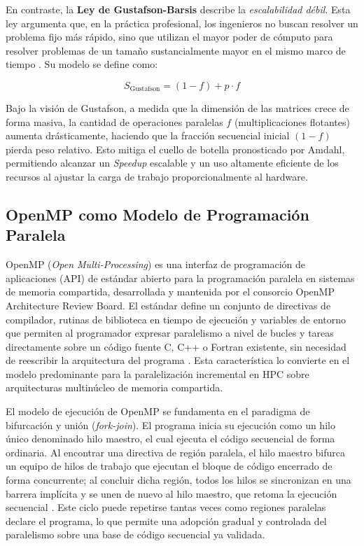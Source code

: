 En contraste, la \textbf{Ley de Gustafson-Barsis} describe la \textit{escalabilidad débil}. Esta ley argumenta que, en la práctica profesional, los ingenieros no buscan resolver un problema fijo más rápido, sino que utilizan el mayor poder de cómputo para resolver problemas de un tamaño sustancialmente mayor en el mismo marco de tiempo \parencite{Gustafson1988Reevaluating}. Su modelo se define como:

\begin{equation}
    S_{\text{Gustafson}} = (1 - f) + p \cdot f
\end{equation}

Bajo la visión de Gustafson, a medida que la dimensión de las matrices crece de forma masiva, la cantidad de operaciones paralelas \(f\) (multiplicaciones flotantes) aumenta drásticamente, haciendo que la fracción secuencial inicial \((1 - f)\) pierda peso relativo. Esto mitiga el cuello de botella pronosticado por Amdahl, permitiendo alcanzar un \textit{Speedup} escalable y un uso altamente eficiente de los recursos al ajustar la carga de trabajo proporcionalmente al hardware.

\subsection{OpenMP como Modelo de Programación Paralela}
OpenMP (\textit{Open Multi-Processing}) es una interfaz de programación de aplicaciones
(API) de estándar abierto para la programación paralela en sistemas de memoria compartida,
desarrollada y mantenida por el consorcio OpenMP Architecture Review Board. El estándar
define un conjunto de directivas de compilador, rutinas de biblioteca en tiempo de ejecución y
variables de entorno que permiten al programador expresar paralelismo a nivel de bucles y
tareas directamente sobre un código fuente C, C++ o Fortran existente, sin necesidad de
reescribir la arquitectura del programa \parencite{Dagum1998OpenMP}. Esta característica lo
convierte en el modelo predominante para la paralelización incremental en HPC sobre
arquitecturas multinúcleo de memoria compartida.

El modelo de ejecución de OpenMP se fundamenta en el paradigma de bifurcación y unión
(\textit{fork-join}). El programa inicia su ejecución como un hilo único denominado hilo maestro,
el cual ejecuta el código secuencial de forma ordinaria. Al encontrar una directiva de región
paralela, el hilo maestro bifurca un equipo de hilos de trabajo que ejecutan el bloque de código
encerrado de forma concurrente; al concluir dicha región, todos los hilos se sincronizan en una
barrera implícita y se unen de nuevo al hilo maestro, que retoma la ejecución secuencial
\parencite{Dagum1998OpenMP}. Este ciclo puede repetirse tantas veces como regiones paralelas
declare el programa, lo que permite una adopción gradual y controlada del paralelismo sobre
una base de código secuencial ya validada.

